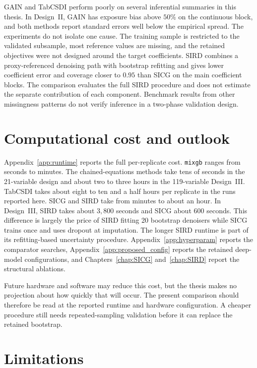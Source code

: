 GAIN and TabCSDI perform poorly on several inferential summaries in this thesis. In Design~II, GAIN has exposure bias above $50\%$ on the continuous block, and both methods report standard errors well below the empirical spread. The experiments do not isolate one cause. The training sample is restricted to the validated subsample, most reference values are missing, and the retained objectives were not designed around the target coefficients. SIRD combines a proxy-referenced denoising path with bootstrap refitting and gives lower coefficient error and coverage closer to $0.95$ than SICG on the main coefficient blocks. The comparison evaluates the full SIRD procedure and does not estimate the separate contribution of each component. Benchmark results from other missingness patterns do not verify inference in a two-phase validation design.

\section{Computational cost and outlook}
\label{sec:conc_cost}

Appendix~\ref{app:runtime} reports the full per-replicate cost. \texttt{mixgb} ranges from seconds to minutes. The chained-equations methods take tens of seconds in the 21-variable design and about two to three hours in the 119-variable Design~III. TabCSDI takes about eight to ten and a half hours per replicate in the runs reported here. SICG and SIRD take from minutes to about an hour. In Design~III, SIRD takes about $3{,}800$ seconds and SICG about $600$ seconds. This difference is largely the price of SIRD fitting 20 bootstrap denoisers while SICG trains once and uses dropout at imputation. The longer SIRD runtime is part of its refitting-based uncertainty procedure. Appendix~\ref{app:hyperparam} reports the comparator searches, Appendix~\ref{app:proposed_config} reports the retained deep-model configurations, and Chapters~\ref{chap:SICG} and~\ref{chap:SIRD} report the structural ablations.

Future hardware and software may reduce this cost, but the thesis makes no projection about how quickly that will occur. The present comparison should therefore be read at the reported runtime and hardware configuration. A cheaper procedure still needs repeated-sampling validation before it can replace the retained bootstrap.

\section{Limitations}
\label{sec:conc_limitations}

